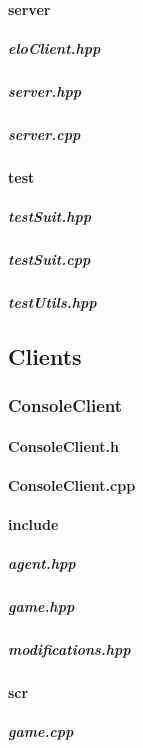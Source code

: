 \documentclass[12pt]{article}
\newcommand{\incFile}[2]{\label{code:#2}}
\begin{document}
\paragraph{server}															%
\subparagraph{eloClient.hpp}										\incFile{C++}{AlphaZeroPytorch/include/Server/eloClient.hpp}
\subparagraph{server.hpp}												\incFile{C++}{AlphaZeroPytorch/include/Server/server.hpp}
\subparagraph{server.cpp}												\incFile{C++}{AlphaZeroPytorch/include/Server/server.cpp}
\paragraph{test}																%
\subparagraph{testSuit.hpp}											\incFile{C++}{AlphaZeroPytorch/include/test/testSuit.hpp}	
\subparagraph{testSuit.cpp}											\incFile{C++}{AlphaZeroPytorch/include/test/testSuit.cpp}
\subparagraph{testUtils.hpp}											\incFile{C++}{AlphaZeroPytorch/include/test/testUtils.hpp}

\subsection{Clients}														%
\subsubsection{ConsoleClient}
\paragraph{ConsoleClient.h}											\incFile{C++}{Clients/ConsoleClient/ConsoleClient.h}
\paragraph{ConsoleClient.cpp}										\incFile{C++}{Clients/ConsoleClient/ConsoleClient.cpp}
\paragraph{include}														%
\subparagraph{agent.hpp}												\incFile{C++}{Clients/ConsoleClient/include/agent.hpp}
\subparagraph{game.hpp}												\incFile{C++}{Clients/ConsoleClient/include/game.hpp}
\subparagraph{modifications.hpp}								\incFile{C++}{Clients/ConsoleClient/include/modifications.hpp}
\paragraph{scr}																%
\subparagraph{game.cpp}												\incFile{C++}{Clients/ConsoleClient/scr/game.cpp}
\end{document}
